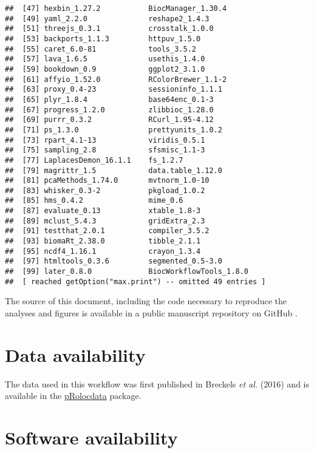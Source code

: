 \documentclass[9pt,a4paper,]{extarticle}
\begin{document}
\begin{verbatim}
##  [47] hexbin_1.27.2           BiocManager_1.30.4     
##  [49] yaml_2.2.0              reshape2_1.4.3         
##  [51] threejs_0.3.1           crosstalk_1.0.0        
##  [53] backports_1.1.3         httpuv_1.5.0           
##  [55] caret_6.0-81            tools_3.5.2            
##  [57] lava_1.6.5              usethis_1.4.0          
##  [59] bookdown_0.9            ggplot2_3.1.0          
##  [61] affyio_1.52.0           RColorBrewer_1.1-2     
##  [63] proxy_0.4-23            sessioninfo_1.1.1      
##  [65] plyr_1.8.4              base64enc_0.1-3        
##  [67] progress_1.2.0          zlibbioc_1.28.0        
##  [69] purrr_0.3.2             RCurl_1.95-4.12        
##  [71] ps_1.3.0                prettyunits_1.0.2      
##  [73] rpart_4.1-13            viridis_0.5.1          
##  [75] sampling_2.8            sfsmisc_1.1-3          
##  [77] LaplacesDemon_16.1.1    fs_1.2.7               
##  [79] magrittr_1.5            data.table_1.12.0      
##  [81] pcaMethods_1.74.0       mvtnorm_1.0-10         
##  [83] whisker_0.3-2           pkgload_1.0.2          
##  [85] hms_0.4.2               mime_0.6               
##  [87] evaluate_0.13           xtable_1.8-3           
##  [89] mclust_5.4.3            gridExtra_2.3          
##  [91] testthat_2.0.1          compiler_3.5.2         
##  [93] biomaRt_2.38.0          tibble_2.1.1           
##  [95] ncdf4_1.16.1            crayon_1.3.4           
##  [97] htmltools_0.3.6         segmented_0.5-3.0      
##  [99] later_0.8.0             BiocWorkflowTools_1.8.0
##  [ reached getOption("max.print") -- omitted 49 entries ]
\end{verbatim}

The source of this document, including the code necessary to reproduce
the analyses and figures is available in a public manuscript
repository on GitHub \citep{ghrepo}.

\hypertarget{data-availability}{%
\section{Data availability}\label{data-availability}}

The data used in this workflow was first published in Breckels \emph{et
al.} (2016) \citep{Breckels:2016} and is available in the
\href{https://bioconductor.org/packages/release/data/experiment/html/pRolocdata.html}{pRolocdata}
package.

\hypertarget{software-availability}{%
\section{Software availability}\label{software-availability}}
\end{document}
